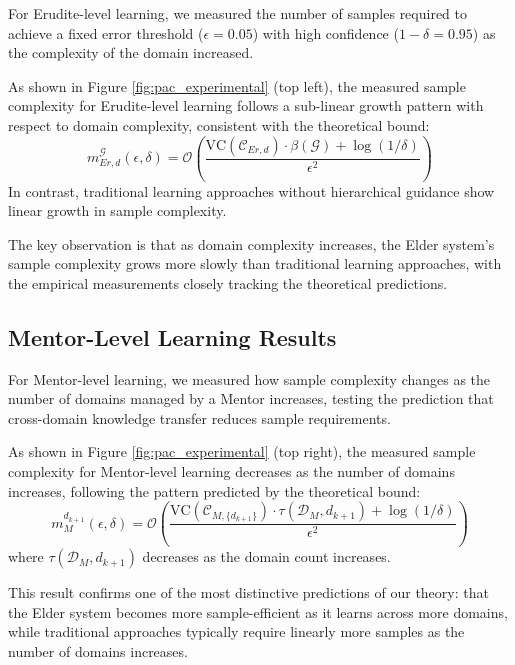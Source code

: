 For Erudite-level learning, we measured the number of samples required to achieve a fixed error threshold ($\epsilon = 0.05$) with high confidence ($1-\delta = 0.95$) as the complexity of the domain increased.

\begin{result}
As shown in Figure \ref{fig:pac_experimental} (top left), the measured sample complexity for Erudite-level learning follows a sub-linear growth pattern with respect to domain complexity, consistent with the theoretical bound:
\begin{equation}
m_{Er,d}^{\mathcal{G}}(\epsilon, \delta) = \mathcal{O}\left(\frac{\text{VC}(\mathcal{C}_{Er,d}) \cdot \beta(\mathcal{G}) + \log(1/\delta)}{\epsilon^2}\right)
\end{equation}
In contrast, traditional learning approaches without hierarchical guidance show linear growth in sample complexity.
\end{result}

The key observation is that as domain complexity increases, the Elder system's sample complexity grows more slowly than traditional learning approaches, with the empirical measurements closely tracking the theoretical predictions.

\subsection{Mentor-Level Learning Results}

For Mentor-level learning, we measured how sample complexity changes as the number of domains managed by a Mentor increases, testing the prediction that cross-domain knowledge transfer reduces sample requirements.

\begin{result}
As shown in Figure \ref{fig:pac_experimental} (top right), the measured sample complexity for Mentor-level learning decreases as the number of domains increases, following the pattern predicted by the theoretical bound:
\begin{equation}
m_{M}^{d_{k+1}}(\epsilon, \delta) = \mathcal{O}\left(\frac{\text{VC}(\mathcal{C}_{M,\{d_{k+1}\}}) \cdot \tau(\mathcal{D}_M, d_{k+1}) + \log(1/\delta)}{\epsilon^2}\right)
\end{equation}
where $\tau(\mathcal{D}_M, d_{k+1})$ decreases as the domain count increases.
\end{result}

This result confirms one of the most distinctive predictions of our theory: that the Elder system becomes more sample-efficient as it learns across more domains, while traditional approaches typically require linearly more samples as the number of domains increases.

